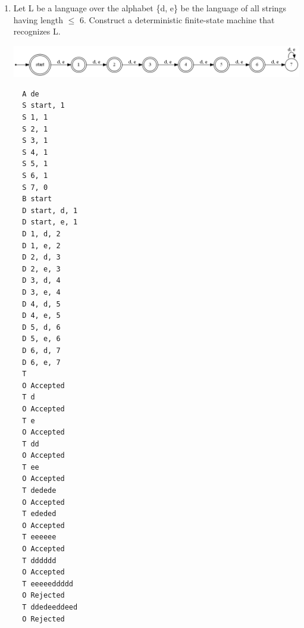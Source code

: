 \documentclass[a4paper]{article}
\begin{document}
\begin{enumerate}
    \begin{verbatim}
  A ab
  S start, 0
  S b, 1
  S ba, 1
  S bb, 0
  S even, 0
  B start
  D start, a, start
  D start, b, b
  D b, a, ba
  D b, b, bb
  D bb, a, bb
  D bb, b, bb
  D ba, a, ba
  D ba, b, even
  D even, a, start
  D even, b, bb
  T a
  O Rejected
  T b
  O Accepted
  T ab
  O Accepted
  T ba
  O Accepted
  T aba
  O Accepted
  T bab
  O Rejected
  T abaaaaba
  O Rejected
  T baaaaababa
  O Accepted
  T bb
  O Rejected
  T abbabbaba
  O Rejected
    \end{verbatim}


    \item Let L be a language over the alphabet \{d, e\} be the language of all
    strings having length $\leq$ 6. Construct a deterministic finite-state machine that
    recognizes L.
    \begin{center}\includegraphics[scale=0.33]{5}\end{center}
    \begin{verbatim}
  A de
  S start, 1
  S 1, 1
  S 2, 1
  S 3, 1
  S 4, 1
  S 5, 1
  S 6, 1
  S 7, 0
  B start
  D start, d, 1
  D start, e, 1
  D 1, d, 2
  D 1, e, 2
  D 2, d, 3
  D 2, e, 3
  D 3, d, 4
  D 3, e, 4
  D 4, d, 5
  D 4, e, 5
  D 5, d, 6
  D 5, e, 6
  D 6, d, 7
  D 6, e, 7
  T 
  O Accepted
  T d
  O Accepted
  T e
  O Accepted
  T dd
  O Accepted
  T ee
  O Accepted
  T dedede
  O Accepted
  T ededed
  O Accepted
  T eeeeee
  O Accepted
  T dddddd
  O Accepted
  T eeeeeddddd
  O Rejected
  T ddedeeddeed
  O Rejected
      
    \end{verbatim}


  \end{enumerate}
\end{document}
